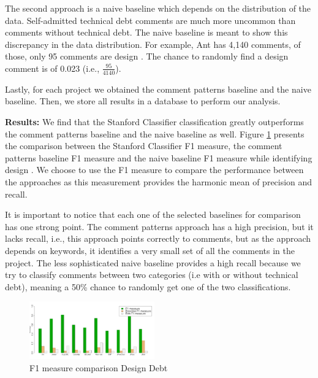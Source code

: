 The second approach is a naive baseline which depends on the distribution of the data. Self-admitted technical debt comments are much more uncommon than comments without technical debt. The naive baseline is meant to show this discrepancy in the data distribution. For example, Ant has 4,140 comments, of those, only 95 comments are design \SATD. The chance to randomly find a design \SATD comment is of 0.023 (i.e., $\frac{95}{4140}$). 

Lastly, for each project we obtained the comment patterns baseline and the naive baseline. Then, we store all results in a database to perform our analysis. 

\vspace{1mm}

\noindent \textbf{Results:} We find that the Stanford Classifier classification greatly outperforms the comment patterns baseline and the naive baseline as well. Figure \ref{fig:f1_measure_comparison_design_debt} presents the comparison between the Stanford Classifier F1 measure, the comment patterns baseline F1 measure and the naive baseline F1 measure while identifying design \SATD. We choose to use the F1 measure to compare the performance between the approaches as this measurement provides the harmonic mean of precision and recall.

It is important to notice that each one of the selected baselines for comparison has one strong point. The comment patterns approach has a high precision, but it lacks recall, i.e., this approach points correctly to \SATD comments, but as the approach depends on keywords, it identifies a very small set of all the \SATD comments in the project. The less sophisticated naive baseline provides a high recall because we try to classify comments between two categories (i.e with or without technical debt), meaning a 50\% chance to randomly get one of the two classifications. 

\begin{figure}[thb!]
   \centering
  \includegraphics[width=0.48\textwidth]{figures/f1_measure_comparisom_design_2.pdf}
  \vspace{-3mm}
  \caption{F1 measure comparison Design Debt}
  \label{fig:f1_measure_comparison_design_debt}
\end{figure}

